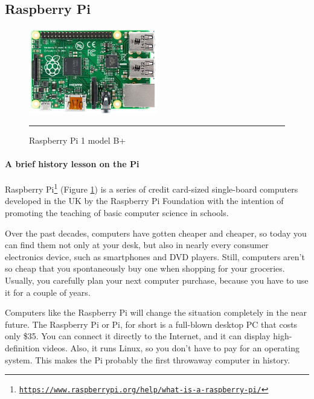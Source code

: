 \subsection{Raspberry Pi}
\begin{figure}
  \begin{center}
    \includegraphics[width=0.5\textwidth]{./Pictures/raspberry_pi_b.jpg}
  \end{center}
  \rule{0.5\textwidth}{0.5pt}
  \caption{Raspberry Pi 1 model B+}
  \label{fig:Raspberry}
\end{figure}
\paragraph*{A brief history lesson on the Pi}
\hfill \break
Raspberry Pi\footnote{\href{https://www.raspberrypi.org/help/what-is-a-raspberry-pi/}{\texttt{https://www.raspberrypi.org/help/what-is-a-raspberry-pi/}}} (Figure \ref{fig:Raspberry}) is a series of credit card-sized single-board computers developed in the UK by the Raspberry Pi Foundation with the intention of promoting the teaching of basic computer science in schools.

Over the past decades, computers have gotten cheaper and cheaper, so today
you can find them not only at your desk, but also in nearly every consumer
electronics device, such as smartphones and DVD players. Still, computers
aren’t so cheap that you spontaneously buy one when shopping for your
groceries. Usually, you carefully plan your next computer purchase, because
you have to use it for a couple of years.

Computers like the Raspberry Pi will change the situation completely in the
near future. The Raspberry Pi or Pi, for short is a full-blown desktop PC
that costs only \$35. You can connect it directly to the Internet, and it can
display high-definition videos. Also, it runs Linux, so you don’t have to pay
for an operating system. This makes the Pi probably the first throwaway
computer in history.

